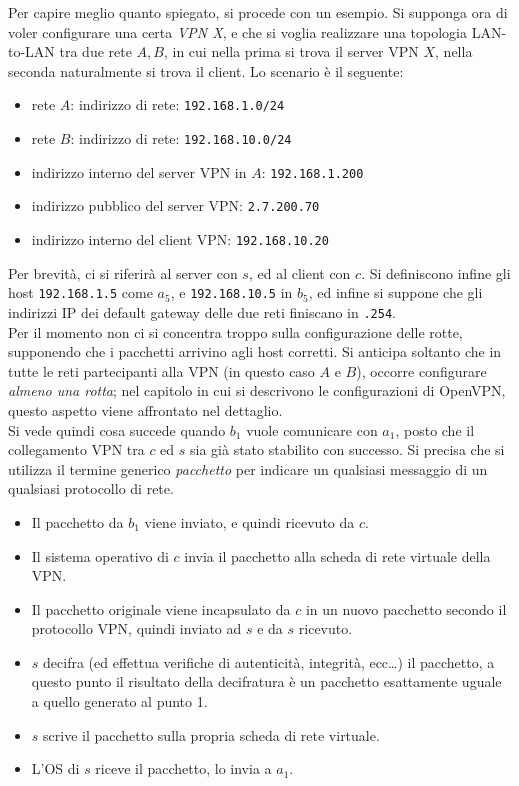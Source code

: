 Per capire meglio quanto spiegato, si procede con un esempio.
Si supponga ora di voler configurare una certa \textit{VPN X}, e che si voglia realizzare una
topologia LAN-to-LAN tra due rete $A, B$, in cui nella prima si trova il server VPN $X$,
nella seconda naturalmente si trova il client.  Lo scenario è il seguente:
\begin{itemize}
  \item rete $A$: indirizzo di rete: \texttt{192.168.1.0/24}
  \item rete $B$: indirizzo di rete: \texttt{192.168.10.0/24}
  \item indirizzo interno del server VPN in $A$: \texttt{192.168.1.200}
  \item indirizzo pubblico del server VPN: \texttt{2.7.200.70}
  \item indirizzo interno del client VPN: \texttt{192.168.10.20}
\end{itemize}
Per brevità, ci si riferirà al server con $s$, ed al client con $c$. Si definiscono
infine gli host \texttt{192.168.1.5} come $a_5$, e \texttt{192.168.10.5} in $b_5$, ed infine
si suppone che gli indirizzi IP
dei default gateway delle due reti finiscano in \texttt{.254}.\\
Per il momento non ci si concentra troppo sulla configurazione delle rotte, supponendo che i
pacchetti arrivino
agli host corretti. Si anticipa soltanto che in tutte le reti partecipanti alla VPN
(in questo caso $A$ e $B$), occorre configurare \textit{almeno una rotta}; nel capitolo in cui si descrivono le configurazioni di OpenVPN,
questo aspetto viene affrontato nel dettaglio.\\
Si vede quindi cosa succede quando $b_1$ vuole comunicare con $a_1$, posto che il
collegamento VPN tra $c$ ed $s$ sia già stato stabilito con successo. Si precisa che
si utilizza il termine generico \textit{pacchetto} per indicare un qualsiasi messaggio
di un qualsiasi protocollo di rete.
\begin{itemize}
  \item Il pacchetto da $b_1$ viene inviato, e quindi ricevuto da $c$.
  \item Il sistema operativo di $c$ invia il pacchetto alla scheda di rete virtuale
  della VPN.
  \item Il pacchetto originale viene incapsulato da $c$ in un nuovo pacchetto secondo
  il protocollo VPN, quindi inviato ad $s$ e da $s$ ricevuto.
  \item $s$ decifra (ed effettua verifiche di autenticità, integrità, ecc\ldots) il
  pacchetto, a questo punto il risultato della decifratura è un pacchetto esattamente
  uguale a quello generato al punto 1.
  \item $s$ scrive il pacchetto sulla propria scheda di rete virtuale.
  \item L'OS di $s$ riceve il pacchetto, lo invia a $a_1$.
\end{itemize}


